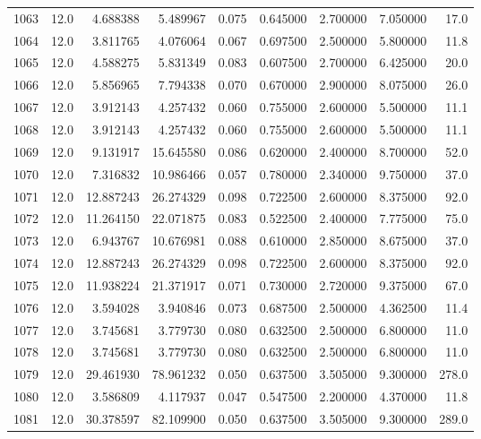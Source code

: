 \begin{tabular}{lrrrrrrrr}
1063 &   12.0 &   4.688388 &   5.489967 &  0.075 &  0.645000 &  2.700000 &   7.050000 &   17.0 \\
1064 &   12.0 &   3.811765 &   4.076064 &  0.067 &  0.697500 &  2.500000 &   5.800000 &   11.8 \\
1065 &   12.0 &   4.588275 &   5.831349 &  0.083 &  0.607500 &  2.700000 &   6.425000 &   20.0 \\
1066 &   12.0 &   5.856965 &   7.794338 &  0.070 &  0.670000 &  2.900000 &   8.075000 &   26.0 \\
1067 &   12.0 &   3.912143 &   4.257432 &  0.060 &  0.755000 &  2.600000 &   5.500000 &   11.1 \\
1068 &   12.0 &   3.912143 &   4.257432 &  0.060 &  0.755000 &  2.600000 &   5.500000 &   11.1 \\
1069 &   12.0 &   9.131917 &  15.645580 &  0.086 &  0.620000 &  2.400000 &   8.700000 &   52.0 \\
1070 &   12.0 &   7.316832 &  10.986466 &  0.057 &  0.780000 &  2.340000 &   9.750000 &   37.0 \\
1071 &   12.0 &  12.887243 &  26.274329 &  0.098 &  0.722500 &  2.600000 &   8.375000 &   92.0 \\
1072 &   12.0 &  11.264150 &  22.071875 &  0.083 &  0.522500 &  2.400000 &   7.775000 &   75.0 \\
1073 &   12.0 &   6.943767 &  10.676981 &  0.088 &  0.610000 &  2.850000 &   8.675000 &   37.0 \\
1074 &   12.0 &  12.887243 &  26.274329 &  0.098 &  0.722500 &  2.600000 &   8.375000 &   92.0 \\
1075 &   12.0 &  11.938224 &  21.371917 &  0.071 &  0.730000 &  2.720000 &   9.375000 &   67.0 \\
1076 &   12.0 &   3.594028 &   3.940846 &  0.073 &  0.687500 &  2.500000 &   4.362500 &   11.4 \\
1077 &   12.0 &   3.745681 &   3.779730 &  0.080 &  0.632500 &  2.500000 &   6.800000 &   11.0 \\
1078 &   12.0 &   3.745681 &   3.779730 &  0.080 &  0.632500 &  2.500000 &   6.800000 &   11.0 \\
1079 &   12.0 &  29.461930 &  78.961232 &  0.050 &  0.637500 &  3.505000 &   9.300000 &  278.0 \\
1080 &   12.0 &   3.586809 &   4.117937 &  0.047 &  0.547500 &  2.200000 &   4.370000 &   11.8 \\
1081 &   12.0 &  30.378597 &  82.109900 &  0.050 &  0.637500 &  3.505000 &   9.300000 &  289.0 \\

\end{tabular}

